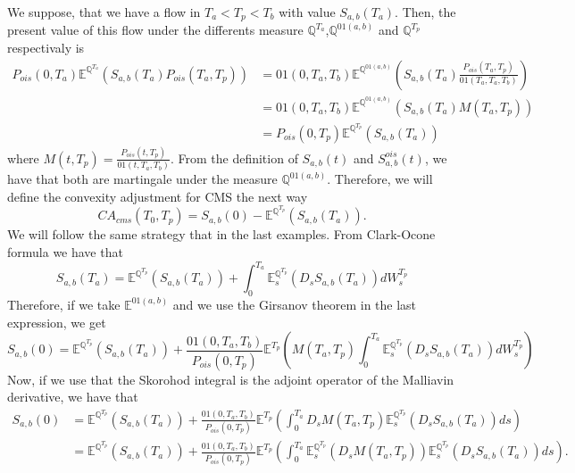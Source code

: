\documentclass[a4paper,10pt]{article}
\newcommand{\1}{\mathbf{1}}
\begin{document}
We suppose, that we have a flow in $T_a < T_p < T_b$ with value $S_{a,b}(T_a)$. Then, the present value of this flow under the differents measure $\mathbb{Q}^{T_a}$,$\mathbb{Q}^{01(a,b)}$ and $\mathbb{Q}^{T_p}$ respectivaly is 
\begin{align}\label{cms_expedted_value}
P_{ois}(0,T_a)\mathbb{E}^{\mathbb{Q}^{T_{a}}}\left(S_{a,b}(T_a) P_{ois}(T_a,T_p) \right) &= 01(0,T_a,T_b) \mathbb{E}^{\mathbb{Q}^{01(a,b)}}\left(S_{a,b}(T_a) \frac{P_{ois}(T_a,T_p)}{01(T_a,T_a,T_b) }\right) \nonumber \\
&= 01(0,T_a,T_b) \mathbb{E}^{\mathbb{Q}^{01(a,b)}}\left(S_{a,b}(T_a) M(T_a,T_p)\right) \\
&=P_{ois}(0,T_p)\mathbb{E}^{\mathbb{Q}^{T_p}}\left(S_{a,b}(T_a)\right)
\end{align}
where $M(t, T_p)= \frac{P_{ois}(t,T_p) }{01(t,T_a,T_b)} $. From the definition of $S_{a,b}(t)$ and $S^{ois}_{a,b}(t)$, we have that both are martingale under the measure $\mathbb{Q}^{01(a,b)}$. Therefore, we will define the convexity adjustment for CMS the next  way
\begin{equation*}
CA_{cms}(T_0,T_p) = S_{a,b}(0) - \mathbb{E}^{\mathbb{Q}^{T_p}}\left(S_{a,b}(T_a)\right). 
\end{equation*}
We will follow the same strategy that in the last examples. From Clark-Ocone formula we have that
\begin{equation*}
S_{a,b}(T_a) = \mathbb{E}^{\mathbb{Q}^{T_p}}\left(S_{a,b}(T_a)\right) + \int_{0}^{T_a} \mathbb{E}_s^{\mathbb{Q}^{T_p}}\left(D_s S_{a,b}(T_a)\right) dW^{T_p}_s 
\end{equation*} 
Therefore, if we take $\mathbb{E}^{01(a,b)}$ and we use the Girsanov theorem  in the last expression, we get 
\begin{equation*}
S_{a,b}(0) = \mathbb{E}^{\mathbb{Q}^{T_p}}\left(S_{a,b}(T_a)\right) + \frac{01(0,T_a,T_b)}{P_{ois}(0,T_p)} \mathbb{E}^{T_p}\left(M(T_a,T_p) \int_{0}^{T_a} \mathbb{E}_s^{\mathbb{Q}^{T_p}}\left(D_s S_{a,b}(T_a)\right) dW^{T_p}_s \right)
\end{equation*}
Now, if we use that the Skorohod integral is the adjoint operator of the Malliavin derivative, we have that
\begin{align*}
S_{a,b}(0) &= \mathbb{E}^{\mathbb{Q}^{T_p}}\left(S_{a,b}(T_a)\right) + \frac{01(0,T_a,T_b)}{P_{ois}(0,T_p)} \mathbb{E}^{T_p}\left(\int_{0}^{T_a} D_s M(T_a,T_p) \mathbb{E}_s^{\mathbb{Q}^{T_p}}\left(D_s S_{a,b}(T_a)\right) ds  \right) \\
&=\mathbb{E}^{\mathbb{Q}^{T_p}}\left(S_{a,b}(T_a)\right) + \frac{01(0,T_a,T_b)}{P_{ois}(0,T_p)} \mathbb{E}^{T_p}\left(\int_{0}^{T_a} \mathbb{E}_s^{\mathbb{Q}^{T_p}}\left(D_s M(T_a,T_p)\right) \mathbb{E}_s^{\mathbb{Q}^{T_p}}\left(D_s S_{a,b}(T_a)\right) ds  \right).
\end{align*}
\end{document}
